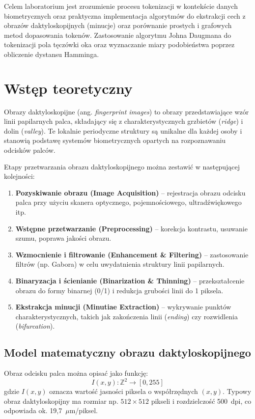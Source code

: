Celem laboratorium jest zrozumienie procesu tokenizacji w kontekście danych biometrycznych oraz
praktyczna implementacja algorytmów do ekstrakcji cech z obrazów daktyloskopijnych (minucje) oraz
porównanie prostych i grafowych metod dopasowania tokenów. Zastosowanie algorytmu Johna
Daugmana do tokenizacji pola tęczówki oka oraz wyznaczanie miary podobieństwa poprzez obliczenie
dystansu Hamminga.

\section{Wstęp teoretyczny}

Obrazy daktyloskopijne (ang. \textit{fingerprint images}) to obrazy przedstawiające wzór linii papilarnych palca, składający się z charakterystycznych grzbietów (\textit{ridge}) i dolin (\textit{valley}). Te lokalnie periodyczne struktury są unikalne dla każdej osoby i stanowią podstawę systemów biometrycznych opartych na rozpoznawaniu odcisków palców.

Etapy przetwarzania obrazu daktyloskopijnego można zestawić w następującej kolejności:

\begin{enumerate}
	\item \textbf{Pozyskiwanie obrazu (Image Acquisition)} – rejestracja obrazu odcisku palca przy użyciu skanera optycznego, pojemnościowego, ultradźwiękowego itp.
	\item \textbf{Wstępne przetwarzanie (Preprocessing)} – korekcja kontrastu, usuwanie szumu, poprawa jakości obrazu.
	\item \textbf{Wzmocnienie i filtrowanie (Enhancement \& Filtering)} – zastosowanie filtrów (np. Gabora) w celu uwydatnienia struktury linii papilarnych.
	\item \textbf{Binaryzacja i ścienianie (Binarization \& Thinning)} – przekształcenie obrazu do formy binarnej (0/1) i redukcja grubości linii do 1 piksela.
	\item \textbf{Ekstrakcja minucji (Minutiae Extraction)} – wykrywanie punktów charakterystycznych, takich jak zakończenia linii (\textit{ending}) czy rozwidlenia (\textit{bifurcation}).
\end{enumerate}

\subsection*{Model matematyczny obrazu daktyloskopijnego}

Obraz odcisku palca można opisać jako funkcję:
\begin{equation}
	I(x, y): \mathbb{Z}^2 \rightarrow [0,255]
\end{equation}
gdzie $I(x,y)$ oznacza wartość jasności piksela o współrzędnych $(x,y)$. Typowy obraz daktyloskopijny ma rozmiar np. $512 \times 512$ pikseli i rozdzielczość 500~dpi, co odpowiada ok. 19,7~$\mu$m/piksel.

